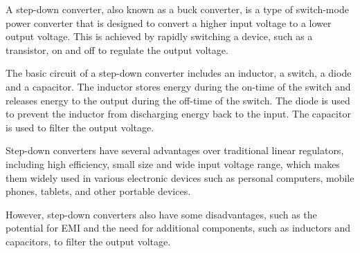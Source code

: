 A step-down converter, also known as a buck converter, is a type of switch-mode power converter that is designed to convert a higher input voltage to a lower output voltage. This is achieved by rapidly switching a device, such as a transistor, on and off to regulate the output voltage.

The basic circuit of a step-down converter includes an inductor, a switch, a diode and a capacitor. The inductor stores energy during the on-time of the switch and releases energy to the output during the off-time of the switch. The diode is used to prevent the inductor from discharging energy back to the input. The capacitor is used to filter the output voltage.

Step-down converters have several advantages over traditional linear regulators, including high efficiency, small size and wide input voltage range, which makes them widely used in various electronic devices such as personal computers, mobile phones, tablets, and other portable devices.

However, step-down converters also have some disadvantages, such as the potential for EMI and the need for additional components, such as inductors and capacitors, to filter the output voltage.





\begin{comment}

additional sources
https://en.wikipedia.org/wiki/Buck_converter
"Switching Power Supply Design" by Abraham I. Pressman
"Design of Switching Power Supplies, UPS and Voltage Stabilizers" by Slawomir Tumanski
"Power Electronics: Converters, Applications, and Design" by Ned Mohan, Tore M. Undeland, William P. Robbins.

\end{comment}